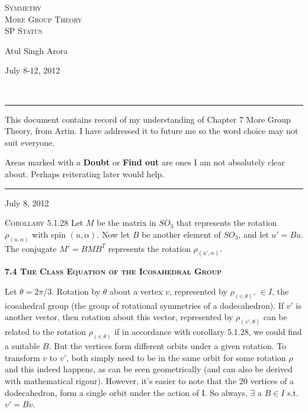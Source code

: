 \documentclass[12pt]{article}
\begin{document}



\begin{center}
\textsc{{\huge Symmetry\\}
More Group Theory\\
\small SP Status\\}
\begin{minipage}{0.4\textwidth}
\begin{flushleft} Atul Singh Arora \end{flushleft}
\end{minipage}
\begin{minipage}{0.4\textwidth}
\begin{flushright} {\small July 8-12, 2012} \end{flushright}
\end{minipage}
\\
\end{center}
\hrule
\vspace{12pt}
This document contains record of my understanding of Chapter 7 More Group Theory, from Artin. I have addressed it to future me so the word choice may not suit everyone.
\par
Areas marked with a {\bf Doubt} or {\bf Find out} are ones I am not absolutely clear about. Perhaps reiterating later would help.\\
\hrule
\vspace{12pt}
\begin{flushright} {\small July 8, 2012} \end{flushright}
\par
\textsc{Corollary 5.1.28 } Let $M$ be the matrix in $SO_{3}$ that represents the rotation $\rho _{(u,\alpha)}$ with spin $(u,\alpha)$. Now let $B$ be another element of $SO_{3}$, and let $u' = Bu$. The conjugate $M'=BMB^{T}$ represents the rotation $\rho _{(u',\alpha)}$.\\
\par
\textbf {\textsc{7.4 The Class Equation of the Icosahedral Group}}
\par
Let $\theta=2\pi / 3$. Rotation by $\theta$ about a vertex $v$, represented by $\rho_{(v,\theta)}$, $\in I$, the icosahedral group (the group of rotational symmetries of a dodecahedron). If $v'$ is another vector, then rotation about this vector, represented by $\rho_{(v',\theta)}$ can be related to the rotation $\rho_{(v,\theta)}$ if in accordance with corollary 5.1.28, we could find a suitable $B$. But the vertices form different orbits under a given rotation. To transform $v$ to $v'$, both simply need to be in the same orbit for some rotation $\rho$ and this indeed happens, as can be seen geometrically (and can also be derived with mathematical rigour). However, it's easier to note that the 20 vertices of a dodecahedron, form a single orbit under the action of I. So always, $\exists$ a $B \in I$ s.t. $v'=Bv$.\\
\end{document}
